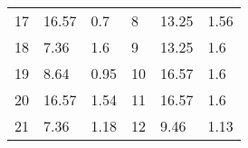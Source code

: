 \documentclass[oneside,onecolumn]{article}
\begin{document}
\begin{table}[]
\begin{tabular}{llllll}
17                                                                                  & 16.57                                                                                                   & 0.7                                                                                    & 8                                                                                    & 13.25                                                                                                   & 1.56                                                                                   \\
18                                                                                  & 7.36                                                                                                    & 1.6                                                                                    & 9                                                                                    & 13.25                                                                                                   & 1.6                                                                                    \\
19                                                                                  & 8.64                                                                                                    & 0.95                                                                                   & 10                                                                                   & 16.57                                                                                                   & 1.6                                                                                    \\
20                                                                                  & 16.57                                                                                                   & 1.54                                                                                   & 11                                                                                   & 16.57                                                                                                   & 1.6                                                                                    \\
21                                                                                  & 7.36                                                                                                    & 1.18                                                                                   & 12                                                                                   & 9.46                                                                                                    & 1.13                                                                                   \\

\end{tabular}
\end{table}
\end{document}
